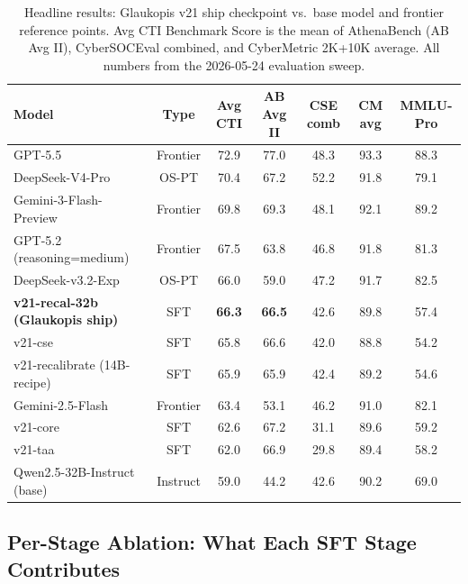 \documentclass[unnumsec,webpdf,contemporary,large]{oup-authoring-template}
\theoremstyle{thmstyleone}
\theoremstyle{thmstyletwo}
\theoremstyle{thmstylethree}
\begin{document}
\begin{table}[t]
\centering
\caption{Headline results: Glaukopis v21 ship checkpoint vs.\ base model and frontier reference points. Avg CTI Benchmark Score is the mean of AthenaBench (AB Avg II), CyberSOCEval combined, and CyberMetric 2K+10K average. All numbers from the 2026-05-24 evaluation sweep.}
\label{tab:results-headline}
\small
\begin{tabular}{lcccccc}
\hline
\textbf{Model} & \textbf{Type} & \textbf{Avg CTI} & \textbf{AB Avg II} & \textbf{CSE comb} & \textbf{CM avg} & \textbf{MMLU-Pro} \\
\hline
GPT-5.5                                  & Frontier  & 72.9 & 77.0 & 48.3 & 93.3 & 88.3 \\
DeepSeek-V4-Pro                          & OS-PT     & 70.4 & 67.2 & 52.2 & 91.8 & 79.1 \\
Gemini-3-Flash-Preview                   & Frontier  & 69.8 & 69.3 & 48.1 & 92.1 & 89.2 \\
GPT-5.2 (reasoning=medium)               & Frontier  & 67.5 & 63.8 & 46.8 & 91.8 & 81.3 \\
DeepSeek-v3.2-Exp                        & OS-PT     & 66.0 & 59.0 & 47.2 & 91.7 & 82.5 \\
\textbf{v21-recal-32b (Glaukopis ship)}  & SFT       & \textbf{66.3} & \textbf{66.5} & 42.6 & 89.8 & 57.4 \\
v21-cse                                  & SFT       & 65.8 & 66.6 & 42.0 & 88.8 & 54.2 \\
v21-recalibrate (14B-recipe)             & SFT       & 65.9 & 65.9 & 42.4 & 89.2 & 54.6 \\
Gemini-2.5-Flash                         & Frontier  & 63.4 & 53.1 & 46.2 & 91.0 & 82.1 \\
v21-core                                 & SFT       & 62.6 & 67.2 & 31.1 & 89.6 & 59.2 \\
v21-taa                                  & SFT       & 62.0 & 66.9 & 29.8 & 89.4 & 58.2 \\
Qwen2.5-32B-Instruct (base)              & Instruct  & 59.0 & 44.2 & 42.6 & 90.2 & 69.0 \\
\hline
\end{tabular}
\end{table}

\subsection{Per-Stage Ablation: What Each SFT Stage Contributes}
\label{sec:results-per-stage}
\end{document}
